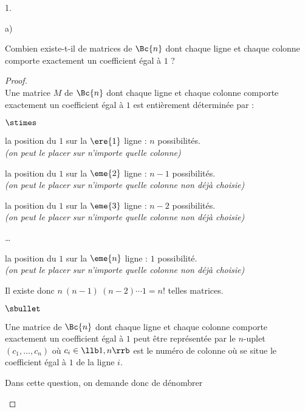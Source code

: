 \begin{noliste}{1.}
\begin{noliste}{a)}
  \item Combien existe-t-il de matrices de $\Bc{n}$ dont chaque ligne
    et chaque colonne comporte exactement un coefficient égal à $1$
    ?
	
    \begin{proof}~\\
      Une matrice $M$ de $\Bc{n}$ dont chaque ligne et chaque colonne
      comporte exactement un coefficient égal à $1$ est entièrement
      déterminée par :
      \begin{noliste}{$\stimes$}
      \item la position du $1$ sur la $\ere{1}$ ligne : $n$
        possibilités.\\
        {\it (on peut le placer sur n'importe quelle colonne)}
      \item la position du $1$ sur la $\eme{2}$ ligne : $n-1$
        possibilités.\\
        {\it (on peut le placer sur n'importe quelle colonne non déjà
          choisie)}
      \item la position du $1$ sur la $\eme{3}$ ligne : $n-2$
        possibilités.\\
        {\it (on peut le placer sur n'importe quelle colonne non déjà
          choisie)}
      \item \ldots
      \item la position du $1$ sur la $\eme{n}$ ligne : $1$
        possibilité.\\
        {\it (on peut le placer sur n'importe quelle colonne non déjà
          choisie)}
      \end{noliste}
      Il existe donc $n \ (n-1) \ (n-2) \cdots 1 = n!$ telles
      matrices.~\\[-.8cm]%
      \begin{remark}%
        \begin{noliste}{$\sbullet$}
        \item Une matrice de $\Bc{n}$ dont chaque ligne et chaque
          colonne comporte exactement un coefficient égal à $1$
          peut être représentée par le $n$-uplet $(c_1, \ldots, c_n)$
          où $c_i \in \llb 1, n \rrb$ est le numéro de colonne où se
          situe le coefficient égal à $1$ de la ligne $i$.
        \item Dans cette question, on demande donc de dénombrer

\end{noliste}
\end{remark}
\end{proof}
\end{noliste}
\end{noliste}

